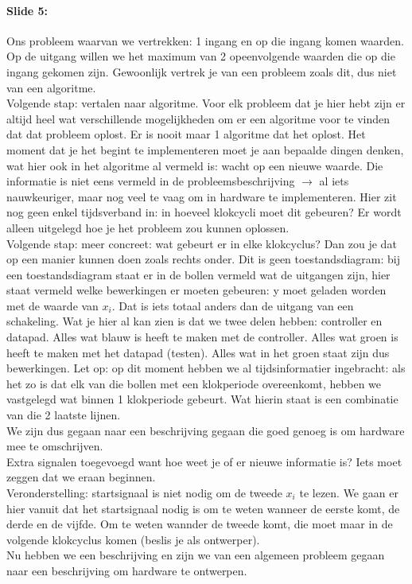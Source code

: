 \documentclass[10pt,a4paper]{book}
\begin{document}
\paragraph{Slide 5:} Ons probleem waarvan we vertrekken: 1 ingang en op die ingang komen waarden. Op de uitgang willen we het maximum van 2 opeenvolgende waarden die op die ingang gekomen zijn. Gewoonlijk vertrek je van een probleem zoals dit, dus niet van een algoritme.\\
Volgende stap: vertalen naar algoritme. Voor elk probleem dat je hier hebt zijn er altijd heel wat verschillende mogelijkheden om er een algoritme voor te vinden dat dat probleem oplost. Er is nooit maar 1 algoritme dat het oplost. Het moment dat je het begint te implementeren moet je aan bepaalde dingen denken, wat hier ook in het algoritme al vermeld is: wacht op een nieuwe waarde. Die informatie is niet eens vermeld in de probleemsbeschrijving $\rightarrow$ al iets nauwkeuriger, maar nog veel te vaag om in hardware te implementeren. Hier zit nog geen enkel tijdsverband in: in hoeveel klokcycli moet dit gebeuren? Er wordt alleen uitgelegd hoe je het probleem zou kunnen oplossen.\\
Volgende stap: meer concreet: wat gebeurt er in elke klokcyclus? Dan zou je dat op een manier kunnen doen zoals rechts onder. Dit is geen toestandsdiagram: bij een toestandsdiagram staat er in de bollen vermeld wat de uitgangen zijn, hier staat vermeld welke bewerkingen er moeten gebeuren: y moet geladen worden met de waarde van $x_i$. Dat is iets totaal anders dan de uitgang van een schakeling. Wat je hier al kan zien is dat we twee delen hebben: controller en datapad. Alles wat blauw is heeft te maken met de controller. Alles wat groen is heeft te maken met het datapad (testen). Alles wat in het groen staat zijn dus bewerkingen. Let op: op dit moment hebben we al tijdsinformatier ingebracht: als het zo is dat elk van die bollen met een klokperiode overeenkomt, hebben we vastgelegd wat binnen 1 klokperiode gebeurt. Wat hierin staat is een combinatie van die 2 laatste lijnen.\\
We zijn dus gegaan naar een beschrijving gegaan die goed genoeg is om hardware mee te omschrijven.\\
Extra signalen toegevoegd want hoe weet je of er nieuwe informatie is? Iets moet zeggen dat we eraan beginnen.\\
Veronderstelling: startsignaal is niet nodig om de tweede $x_i$ te lezen. We gaan er hier vanuit dat het startsignaal nodig is om te weten wanneer de eerste komt, de derde en de vijfde. Om te weten wannder de tweede komt, die moet maar in de volgende klokcyclus komen (beslis je als ontwerper).\\
Nu hebben we een beschrijving en zijn we van een algemeen probleem gegaan naar een beschrijving om hardware te ontwerpen.
\end{document}
